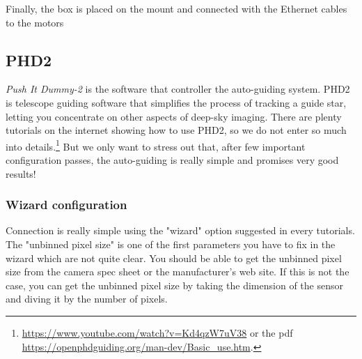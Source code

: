 
Finally, the box is placed on the mount and connected with the Ethernet cables to the motors

\subsection{PHD2}
\textit{Push It Dummy-2} is the software that controller the auto-guiding system.
PHD2 is telescope guiding software that simplifies the process of tracking a guide star, letting you concentrate on other aspects of deep-sky imaging.
There are plenty tutorials on the internet showing how to use PHD2, so we do not enter so much into details.\footnote{\url{https://www.youtube.com/watch?v=Kd4qzW7uV38} or the pdf \url{https://openphdguiding.org/man-dev/Basic_use.htm}.}
But we only want to stress out that, after few important configuration passes, the auto-guiding is really simple and promises very good results!

\subsubsection{Wizard configuration}
Connection is really simple using the "wizard" option suggested in every tutorials.
The "unbinned pixel size" is one of the first parameters you have to fix in the wizard which are not quite clear.
You should be able to get the unbinned pixel size from the camera spec sheet or the manufacturer's web site.
If this is not the case, you can get the unbinned pixel size by taking the dimension of the sensor and diving it by the number of pixels.

